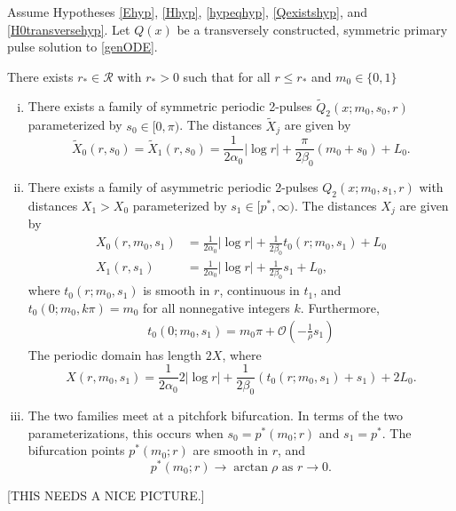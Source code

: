 \documentclass[thesis.tex]{subfiles}
\begin{document}
\begin{theorem}\label{2pulsebifurcation}
Assume Hypotheses \ref{Ehyp}, \ref{Hhyp}, \ref{hypeqhyp}, \ref{Qexistshyp}, and \ref{H0transversehyp}. Let $Q(x)$ be a transversely constructed, symmetric primary pulse solution to \eqref{genODE}.

There exists $r_* \in \mathcal{R}$ with $r_* > 0$ such that for all $r \leq r_*$ and $m_0 \in \{0, 1\}$
\begin{enumerate}[(i)]
	\item There exists a family of symmetric periodic 2-pulses $\tilde{Q}_2(x; m_0, s_0, r)$ parameterized by $s_0 \in [0, \pi)$. The distances $\tilde{X}_j$ are given by
	\begin{equation}\label{2psymmdist}
		\tilde{X}_0(r, s_0) = \tilde{X}_1(r, s_0) = \frac{1}{2 \alpha_0} |\log r| + \frac{\pi}{2\beta_0} (m_0 + s_0) + L_0.
	\end{equation}
	\item There exists a family of asymmetric periodic 2-pulses $Q_2(x; m_0, s_1, r)$ with distances $X_1 > X_0$ parameterized by $s_1 \in [p^*, \infty)$. The distances $X_j$ are given by
	\begin{equation}\label{2pasymmdist}
	\begin{aligned}
		X_0(r, m_0, s_1) &= \frac{1}{2 \alpha_0} |\log r| + \frac{1}{2\beta_0} t_0(r; m_0, s_1) + L_0 \\
		X_1(r, s_1) &= \frac{1}{2 \alpha_0} |\log r| + \frac{1}{2\beta_0} s_1 + L_0, 
	\end{aligned}
	\end{equation}
	where $t_0(r; m_0, s_1)$ is smooth in $r$, continuous in $t_1$, and $t_0(0; m_0, k \pi) = m_0$ for all nonnegative integers $k$. Furthermore,
	\begin{align}\label{deft0}
	t_0(0; m_0, s_1) = m_0 \pi + \mathcal{O}\left(-\frac{1}{\rho} s_1 \right)
	\end{align}
	The periodic domain has length $2X$, where
	\begin{equation}\label{X2pdomain}
	X(r, m_0, s_1) = \frac{1}{2 \alpha_0} 2 |\log r| + \frac{1}{2\beta_0} \left( t_0(r; m_0, s_1) + s_1\right) + 2 L_0.
	\end{equation}

	\item The two families meet at a pitchfork bifurcation. In terms of the two parameterizations, this occurs when $s_0 = p^*(m_0; r)$ and $s_1 = p^*$. The bifurcation points $p^*(m_0; r)$ are smooth in $r$, and
	\[
	p^*(m_0; r) \rightarrow \arctan \rho \text{ as }r \rightarrow 0.
	\]
\end{enumerate}
\end{theorem}
[THIS NEEDS A NICE PICTURE.]
\end{document}

